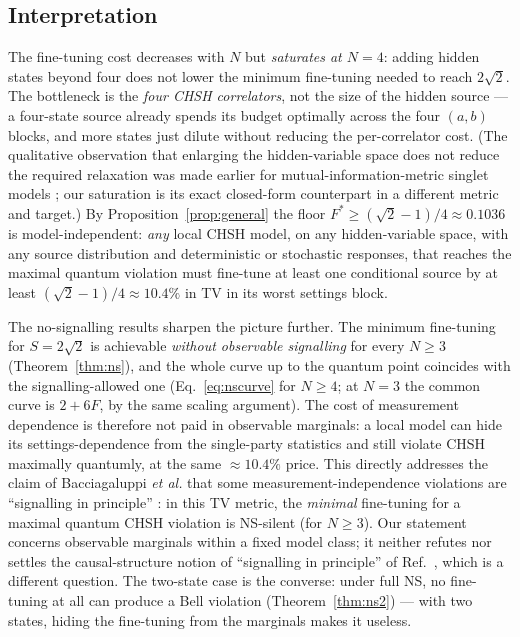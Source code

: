\documentclass[aps,pra,reprint,superscriptaddress,floatfix]{revtex4-2}
\begin{document}
\subsection{Interpretation}
The fine-tuning cost decreases with $N$ but \emph{saturates at $N=4$}: adding
hidden states beyond four does not lower the minimum fine-tuning needed to
reach $2\sqrt2$. The bottleneck is the \emph{four CHSH correlators}, not the
size of the hidden source --- a four-state source already spends its budget
optimally across the four $(a,b)$ blocks, and more states just dilute without
reducing the per-correlator cost. (The qualitative observation that enlarging
the hidden-variable space does not reduce the required relaxation was made
earlier for mutual-information-metric singlet models \cite{rossisouza2018};
our saturation is its exact closed-form counterpart in a different metric and
target.) By Proposition~\ref{prop:general} the floor
$F^*\ge(\sqrt2-1)/4\approx0.1036$ is model-independent: \emph{any} local CHSH
model, on any hidden-variable space, with any source distribution and
deterministic or stochastic responses, that reaches the maximal quantum
violation must fine-tune at least one conditional source by at least
$(\sqrt2-1)/4\approx10.4\%$ in TV in its worst settings block.

The no-signalling results sharpen the picture further. The minimum
fine-tuning for $S=2\sqrt2$ is achievable \emph{without observable
signalling} for every $N\ge3$ (Theorem~\ref{thm:ns}), and the whole curve up
to the quantum point coincides with the signalling-allowed one
(Eq.~\eqref{eq:nscurve} for $N\ge4$; at $N=3$ the common curve is $2+6F$,
by the same scaling argument). The cost of measurement dependence is therefore
not paid in observable marginals: a local model can hide its
settings-dependence from the single-party statistics and still violate CHSH
maximally quantumly, at the same $\approx10.4\%$ price. This directly
addresses the claim of Bacciagaluppi \emph{et al.} that some
measurement-independence violations are ``signalling in principle''
\cite{bhl2026}: in this TV metric, the \emph{minimal} fine-tuning for a
maximal quantum CHSH violation is NS-silent (for $N\ge3$). Our statement
concerns observable marginals within a fixed model class; it neither refutes
nor settles the causal-structure notion of ``signalling in principle'' of
Ref.~, which is a different question. The two-state case
is the converse: under full NS, no fine-tuning at all can produce a Bell
violation (Theorem~\ref{thm:ns2}) --- with two states, hiding the
fine-tuning from the marginals makes it useless.
\end{document}
